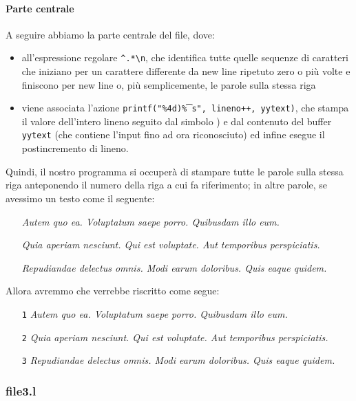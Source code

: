 \documentclass[class=book, crop=false, oneside, 12pt]{standalone}
\begin{document}
\paragraph{Parte centrale}
A seguire abbiamo la parte centrale del file, dove: 

\begin{itemize}
    \item all'espressione regolare \texttt{\^{}.*\textbackslash n}, che identifica tutte quelle sequenze di caratteri che iniziano per un carattere differente da new line ripetuto zero o più volte e finiscono per new line o, più semplicemente, le parole sulla stessa riga
    \item  viene associata l'azione \texttt{printf("\%4d)\t\%s", lineno++, yytext)}, che stampa il valore dell'intero lineno seguito dal simbolo ) e dal contenuto del buffer \texttt{yytext} (che contiene l'input fino ad ora riconosciuto) ed infine esegue il postincremento di lineno.
\end{itemize}

\noindent Quindi, il nostro programma si occuperà di stampare tutte le parole sulla stessa riga anteponendo il numero della riga a cui fa riferimento; in altre parole, se avessimo un testo come il seguente:
\begin{itemize}[noitemsep]
    \item[] \emph{Autem quo ea. Voluptatum saepe porro. Quibusdam illo eum.}
    \item[] \emph{Quia aperiam nesciunt. Qui est voluptate. Aut temporibus perspiciatis.}
    \item[] \emph{Repudiandae delectus omnis. Modi earum doloribus. Quis eaque quidem.}
\end{itemize}
Allora avremmo che verrebbe riscritto come segue:
\begin{enumerate}[noitemsep]
    \item[\texttt{1}] \emph{Autem quo ea. Voluptatum saepe porro. Quibusdam illo eum.}
    \item[\texttt{2}] \emph{Quia aperiam nesciunt. Qui est voluptate. Aut temporibus perspiciatis.}
    \item[\texttt{3}] \emph{Repudiandae delectus omnis. Modi earum doloribus. Quis eaque quidem.}
\end{enumerate}


\subsubsection{file3.l}
\end{document}
